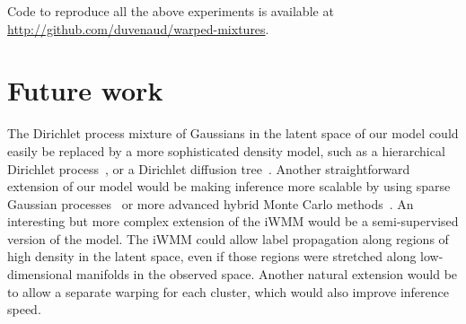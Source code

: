 Code to reproduce all the above experiments is available at \url{http://github.com/duvenaud/warped-mixtures}.

\section{Future work}

The Dirichlet process mixture of Gaussians in the latent space of our model could easily be replaced by a more sophisticated density model, such as a hierarchical Dirichlet process~\cite{teh2006hierarchical}, or a Dirichlet diffusion tree~\cite{neal2003density}.
Another straightforward extension of our model would be making inference more scalable by using sparse Gaussian processes~\cite{quinonero2005unifying,snelson2006sparse} or more advanced hybrid Monte Carlo methods~\cite{zhang2011quasi}.
An interesting but more complex extension of the iWMM would be a semi-supervised version of the model.
The iWMM could allow label propagation along regions of high density in the latent space, even if those regions were stretched along low-dimensional manifolds in the observed space.  Another natural extension would be to allow a separate warping for each cluster, which would also improve inference speed.




%
%

